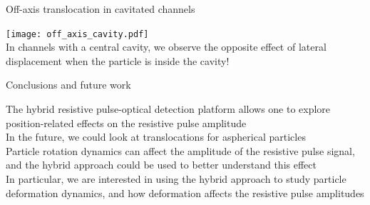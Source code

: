 

\begin{frame}[c]{Off-axis translocation in cavitated channels}
	
	{\centering
		\texttt{[image: off\_axis\_cavity.pdf]} \\
		{\scriptsize \textcolor{negativered}{In channels with a central cavity, we observe the opposite effect of lateral displacement when the particle is inside the cavity! } } \\
		\par
	}
	
\end{frame}






\begin{frame}[c]{Conclusions and future work}
	
	{\centering
		The hybrid resistive pulse-optical detection platform allows one to explore position-related effects on the resistive pulse amplitude \\
		In the future, we could look at translocations for aspherical particles \\
		Particle rotation dynamics can affect the amplitude of the resistive pulse signal, and the hybrid approach could be used to better understand this effect \\
		In particular, we are interested in using the hybrid approach to study particle deformation dynamics, and how deformation affects the resistive pulse amplitudes \\
	}
	
\end{frame}



